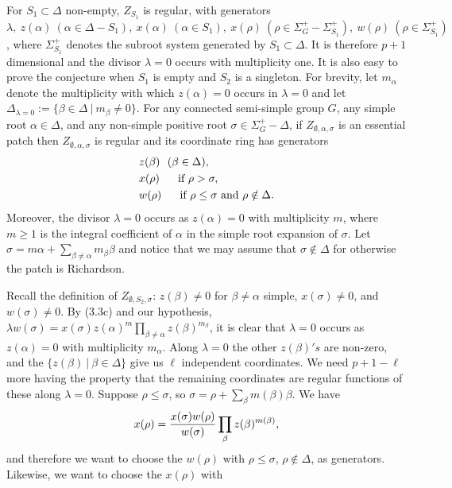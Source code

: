 For $S_1\subset \Delta$ non-empty, $Z_{S_1}$ is regular, with
generators $\lambda,\  z(\alpha)\ (\alpha\in\Delta -S_1),
\  x(\alpha)\ (\alpha\in S_1),\ x(\rho)\
(\rho\in\Sigma_G^+-\Sigma_{S_1}^+),
\ w(\rho)\ (\rho\in \Sigma_{S_1}^+)$, where $\Sigma_{S_1}^+$ denotes the
subroot system generated by $S_1\subset \Delta$.
It is therefore $p+1$ dimensional and the divisor $\lambda =0$ occurs with
multiplicity one.
\endproclaim
It is also easy to prove the conjecture when $S_1$ is empty and $S_2$ is
a singleton.
For brevity, let $m_\alpha$ denote the multiplicity with
which $z(\alpha)=0$ occurs in $\lambda =0$ and let
$\Delta_{\lambda =0}:=\{\beta\in\Delta\ |\ m_{\beta}\not= 0\}$.
 For any connected semi-simple group $G$, any
simple root $\alpha\in\Delta$, and any non-simple positive root
$\sigma\in\Sigma_G^+ -\Delta$, if
$Z_{\emptyset,\alpha,\sigma}$ is an essential patch then
$Z_{\emptyset,\alpha,\sigma}$ is regular and its coordinate ring has generators
$$
\split
&z(\beta )\ \ (\beta\in\Delta ),\\
&x(\rho) \ \ \ \ \text{ if }
\rho >\sigma, \\
&w(\rho) \ \ \ \ 
\text{ if }
\rho \leq \sigma
\text{ and }\rho\notin\Delta.
\endsplit
$$
Moreover, the divisor $\lambda =0$ occurs as $z(\alpha)=0$
with multiplicity $m$, where $m\geq 1$ is the integral coefficient of
$\alpha$ in the simple root expansion of $\sigma$.
\endproclaim
{} Let $\sigma=m\alpha +\sum_{\beta\not= \alpha}m_\beta\beta$
and notice that we may assume that
$\sigma\notin \Delta$ for otherwise the patch is Richardson.
\par
Recall the definition of $Z_{\emptyset,S_2,\sigma}$: $z(\beta)\not= 0$
for $\beta\not=\alpha$ simple, $x(\sigma)\not= 0$, and
$w(\sigma)\not= 0$. By (3.3c) and our hypothesis,
$\lambda w(\sigma)
=x(\sigma)z(\alpha)^m\prod_{\beta\not= \alpha}z(\beta)^{m_\beta}$,
it is clear that
$\lambda=0$ occurs as $z(\alpha)=0$
with multiplicity $m_\alpha$. Along $\lambda=0$ the other $z(\beta)'s$
are non-zero, 
and the $\{z(\beta)\ |\ \beta\in\Delta\}$
give us $\ell$ independent coordinates. We need
$p+1-\ell$ more having the property that the remaining coordinates
are regular functions of these along $\lambda =0$. Suppose
$\rho \leq\sigma$, so $\sigma=\rho +\sum_\beta m(\beta)\beta$.
We have
$$
x(\rho)={x(\sigma)w(\rho)\over w(\sigma)}
\prod_\beta z(\beta)^{m(\beta)},
$$
and therefore we want to choose the $w(\rho)$ with $\rho \leq\sigma$,
$\rho\notin \Delta$,
as generators. Likewise, we want to choose the $x(\rho)$ with
